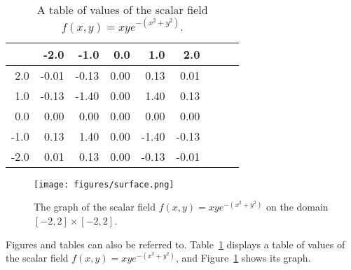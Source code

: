 \documentclass[11pt]{article}
\begin{document}
\begin{table}[h] %
	\centering
	\begin{tabular}{|r|r|r|r|r|r|r|r|r|} %
		\hline \backslashbox{$y$}{$x$} & -2.0 & -1.0 & 0.0 & 1.0 & 2.0 \\
		\hline 2.0 & -0.01 & -0.13 &  0.00 &  0.13 &  0.01 \\
		\hline 1.0 & -0.13 & -1.40 &  0.00 &  1.40 &  0.13 \\
		\hline 0.0 & 0.00 &  0.00 &  0.00 &  0.00 &  0.00 \\
		\hline -1.0 & 0.13 & 1.40 &  0.00 & -1.40 & -0.13 \\
		\hline -2.0 & 0.01 &  0.13 &  0.00 & -0.13 & -0.01 \\
		\hline
	\end{tabular}
	\caption{A table of values of the scalar field $f(x,y) = xy e^{-(x^2 + y^2)}$.}
	\label{tab:field}
\end{table}

\begin{figure}[h]
	\centering
	\texttt{[image: figures/surface.png]}
	\caption{The graph of the scalar field $f(x,y) = xy e^{-(x^2 + y^2)}$ on the domain $[-2,2] \times [-2,2]$.}
	\label{fig:field}
\end{figure}

Figures and tables can also be referred to. Table~\ref{tab:field} displays a table of values of the scalar field $f(x,y) = xy e^{-(x^2 + y^2)}$, and Figure~\ref{fig:field} shows its graph.
\end{document}
